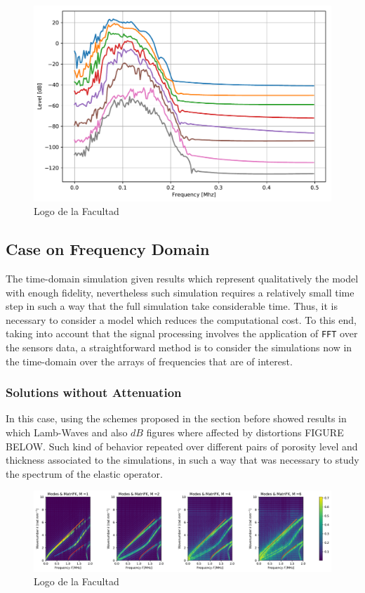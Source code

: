 \begin{figure}[!h]
	\centering
	\includegraphics[scale=.5]{images/TimeSingSous/2DTimeHilb_P7Elastic30_SV.pdf}
	\caption{Logo de la Facultad}
	\label{klbvcsda}
\end{figure}

\subsection{Case on Frequency Domain}

The time-domain simulation given results which represent qualitatively the model with enough fidelity, nevertheless such simulation requires a relatively small time step in such a way that the full simulation take considerable time. Thus, it is necessary to consider a model which reduces the computational cost.
To this end, taking into account that the signal processing involves the application of \texttt{FFT} over the sensors data, a straightforward method is to consider the simulations now in the time-domain over the arrays of frequencies that are of interest.
\subsubsection{Solutions without Attenuation}
In this case, using the schemes proposed in the section before showed results in which Lamb-Waves and also $dB$ figures where affected by distortions FIGURE BELOW. Such kind of behavior repeated over different pairs of porosity level and thickness associated to the simulations, in such a way that was necessary to study the spectrum of the elastic operator.

\begin{figure}[!h]
	\centering
	\includegraphics[width=\textwidth]{images/FreqRes/2DFreqS8P10ElasticFK09M300_y.pdf}
	\caption{Logo de la Facultad}
	\label{kdasl6t}
\end{figure} 

